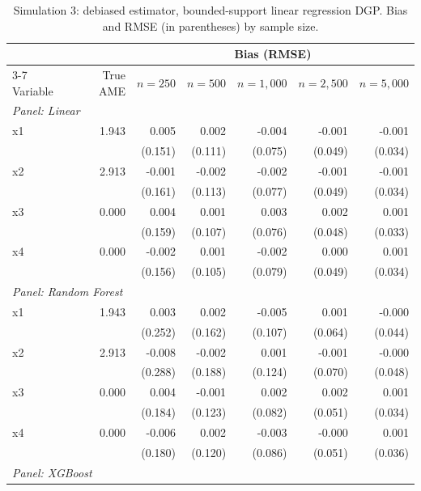 \documentclass[12pt,a4paper]{article}
\numberwithin{equation}{section}
\theoremstyle{plain}
\theoremstyle{definition}
\begin{document}
	\begin{table}[htbp]
		\centering
		\small
		\begin{threeparttable}
			\caption{Simulation 3: debiased estimator, bounded-support linear regression DGP. Bias and RMSE (in parentheses) by sample size.}
			\label{tab:sim3_bias_regression_linear_uniform}
			\begin{tabular}{lrrrrrr}
				\toprule
				& & \multicolumn{5}{c}{Bias (RMSE)} \\
				\cmidrule(lr){3-7}
				Variable & True AME & $n=250$ & $n=500$ & $n=1,000$ & $n=2,500$ & $n=5,000$ \\
				\midrule
				\multicolumn{7}{l}{\textit{Panel: Linear}} \\
				\quad x1 & 1.943 & 0.005 & 0.002 & -0.004 & -0.001 & -0.001 \\
				&  & (0.151) & (0.111) & (0.075) & (0.049) & (0.034) \\
				\quad x2 & 2.913 & -0.001 & -0.002 & -0.002 & -0.001 & -0.001 \\
				&  & (0.161) & (0.113) & (0.077) & (0.049) & (0.034) \\
				\quad x3 & 0.000 & 0.004 & 0.001 & 0.003 & 0.002 & 0.001 \\
				&  & (0.159) & (0.107) & (0.076) & (0.048) & (0.033) \\
				\quad x4 & 0.000 & -0.002 & 0.001 & -0.002 & 0.000 & 0.001 \\
				&  & (0.156) & (0.105) & (0.079) & (0.049) & (0.034) \\
				\midrule
				\multicolumn{7}{l}{\textit{Panel: Random Forest}} \\
				\quad x1 & 1.943 & 0.003 & 0.002 & -0.005 & 0.001 & -0.000 \\
				&  & (0.252) & (0.162) & (0.107) & (0.064) & (0.044) \\
				\quad x2 & 2.913 & -0.008 & -0.002 & 0.001 & -0.001 & -0.000 \\
				&  & (0.288) & (0.188) & (0.124) & (0.070) & (0.048) \\
				\quad x3 & 0.000 & 0.004 & -0.001 & 0.002 & 0.002 & 0.001 \\
				&  & (0.184) & (0.123) & (0.082) & (0.051) & (0.034) \\
				\quad x4 & 0.000 & -0.006 & 0.002 & -0.003 & -0.000 & 0.001 \\
				&  & (0.180) & (0.120) & (0.086) & (0.051) & (0.036) \\
				\midrule
				\multicolumn{7}{l}{\textit{Panel: XGBoost}} \\

\end{tabular}
\end{threeparttable}
\end{table}
\end{document}
